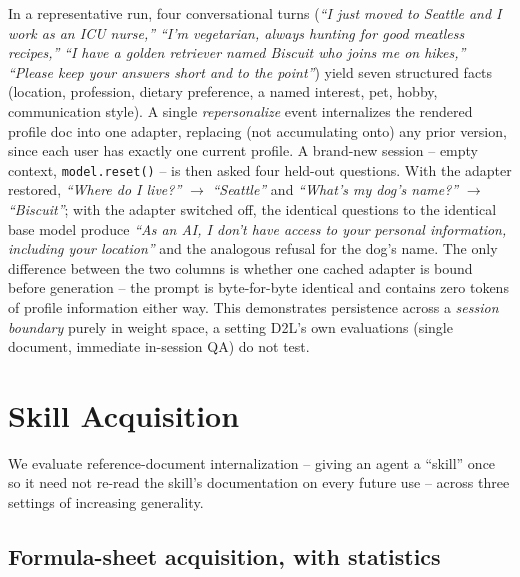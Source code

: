 \documentclass[11pt]{article}
\newcommand{\DTL}{D2L}
\newcommand{\mt}[1]{\texttt{\small #1}}
\begin{document}
In a representative run, four conversational turns (\emph{``I just moved to Seattle and I work as an ICU nurse,''} \emph{``I'm vegetarian, always hunting for good meatless recipes,''} \emph{``I have a golden retriever named Biscuit who joins me on hikes,''} \emph{``Please keep your answers short and to the point''}) yield seven structured facts (location, profession, dietary preference, a named interest, pet, hobby, communication style). A single \emph{repersonalize} event internalizes the rendered profile doc into one adapter, replacing (not accumulating onto) any prior version, since each user has exactly one current profile. A brand-new session -- empty context, \mt{model.reset()} -- is then asked four held-out questions. With the adapter restored, \emph{``Where do I live?''} $\to$ \emph{``Seattle''} and \emph{``What's my dog's name?''} $\to$ \emph{``Biscuit''}; with the adapter switched off, the identical questions to the identical base model produce \emph{``As an AI, I don't have access to your personal information, including your location''} and the analogous refusal for the dog's name. The only difference between the two columns is whether one cached adapter is bound before generation -- the prompt is byte-for-byte identical and contains zero tokens of profile information either way. This demonstrates persistence across a \emph{session boundary} purely in weight space, a setting \DTL{}'s own evaluations (single document, immediate in-session QA) do not test.

\section{Skill Acquisition}
\label{sec:skills}

We evaluate reference-document internalization -- giving an agent a ``skill'' once so it need not re-read the skill's documentation on every future use -- across three settings of increasing generality.

\subsection{Formula-sheet acquisition, with statistics}
\label{sec:physics}
\end{document}
